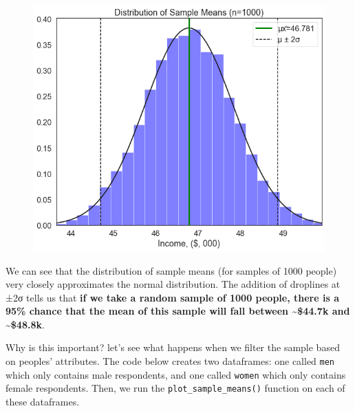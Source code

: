 \documentclass[
  letterpaper,
  DIV=11,
  numbers=noendperiod]{scrreprt}
\begin{document}
\begin{figure}[H]

{\centering \includegraphics{notebooks/W07. Distributions and Basic Statistics_files/figure-pdf/cell-26-output-1.png}

}

\end{figure}

We can see that the distribution of sample means (for samples of 1000
people) very closely approximates the normal distribution. The addition
of droplines at ±2σ tells us that \textbf{if we take a random sample of
1000 people, there is a 95\% chance that the mean of this sample will
fall between \textasciitilde\$44.7k and \textasciitilde\$48.8k}.

Why is this important? let's see what happens when we filter the sample
based on peoples' attributes. The code below creates two dataframes: one
called \texttt{men} which only contains male respondents, and one called
\texttt{women} which only contains female respondents. Then, we run the
\texttt{plot\_sample\_means()} function on each of these dataframes.
\end{document}
